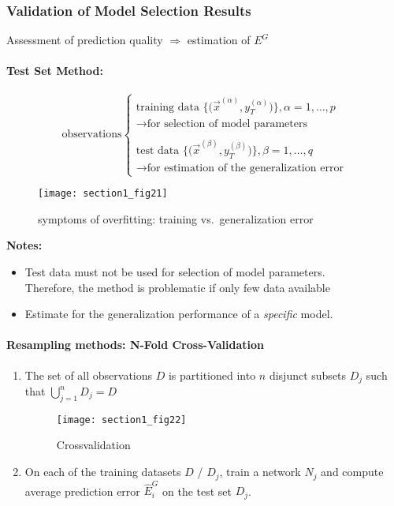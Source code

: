 
\subsubsection{Validation of Model Selection Results}
Assessment of prediction quality $\Rightarrow$ estimation of $E^G$
\paragraph{Test Set Method:} \mbox{}
\begin{equation*}
  \text{observations} \left \{ 
   \begin{array}{l}
   	\text{training data } \Big\{ \Big( \vec{x}^{(\alpha)}, y_T^{(\alpha)}
		\Big) \Big\}, \alpha = 1, \ldots, p \\
	\rightarrow \text{for selection of model parameters} \\\\
	\text{test data } \Big\{ \Big( \vec{x}^{(\beta)}, y_T^{(\beta)}
		\Big) \Big\}, \beta = 1, \ldots, q \\
	\rightarrow \text{for estimation of the generalization error}
\end{array} \right.
\end{equation*}

\begin{figure}[h]
  \centering
\texttt{[image: section1\_fig21]}  
  \caption{symptoms of overfitting: training vs.\ generalization error}
\end{figure}


\textbf{Notes:} 
\begin{itemize}
\item Test data must not be used for selection of model parameters.\\
Therefore, the method is problematic if only few data available
\item Estimate for the generalization performance of a \emph{specific} model. 
\end{itemize}

\paragraph{Resampling methods: N-Fold Cross-Validation}
\begin{enumerate}[(1)]
\item The set of all observations $D$ is partitioned into $n$ disjunct subsets $D_j$ such that $\bigcup\limits_{j = 1}^n D_j = D$\\
  \begin{figure}[h]
    \centering
\texttt{[image: section1\_fig22]}    
    \caption{Crossvalidation}
    \label{fig:crossvalidation}
  \end{figure}

\item On each of the training datasets $D$ / $D_j$, train a network $N_j$ and compute average prediction error $\hat{E}_i^G$ on the test set $D_j$.
\end{enumerate}

